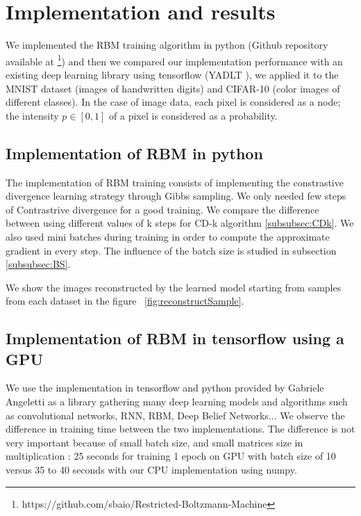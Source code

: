 \documentclass{article}
\begin{document}
\section{Implementation and results}

We implemented the RBM training algorithm in python (Github repository available at \footnote{https://github.com/sbaio/Restricted-Boltzmann-Machine}) and then we compared our implementation performance with an existing deep learning library using tensorflow (YADLT \cite{yadltGithub}), we applied it to the MNIST dataset (images of handwritten digits) and CIFAR-10 (color images of different classes). In the case of image data, each pixel is considered as a node; the intensity $p \in [0,1]$ of a pixel is considered as a probability. \\

\subsection{Implementation of RBM in python}

The implementation of RBM training consists of implementing the constrastive divergence learning strategy through Gibbs sampling. We only needed few steps of Contrastrive divergence for a good training. We compare the difference between using different values of k steps for CD-k algorithm \ref{subsubsec:CDk}.
We also used mini batches during training in order to compute the approximate gradient in every step. The influence of the batch size is studied in subsection \ref{subsubsec:BS}.

We show the images reconstructed by the learned model starting from samples from each dataset in the figure ~\ref{fig:reconstructSample}.


\subsection{Implementation of RBM in tensorflow using a GPU}

We use the implementation in tensorflow and python provided by Gabriele Angeletti as a library gathering many deep learning models and algorithms such as convolutional networks, RNN, RBM, Deep Belief Networks... We observe the difference in training time between the two implementations. The difference is not very important because of small batch size, and small matrices size in multiplication \cite{fatahalian2004understanding}: 25 seconds for training 1 epoch on GPU with batch size of 10 versus 35 to 40 seconds with our CPU implementation using numpy. 
\end{document}
